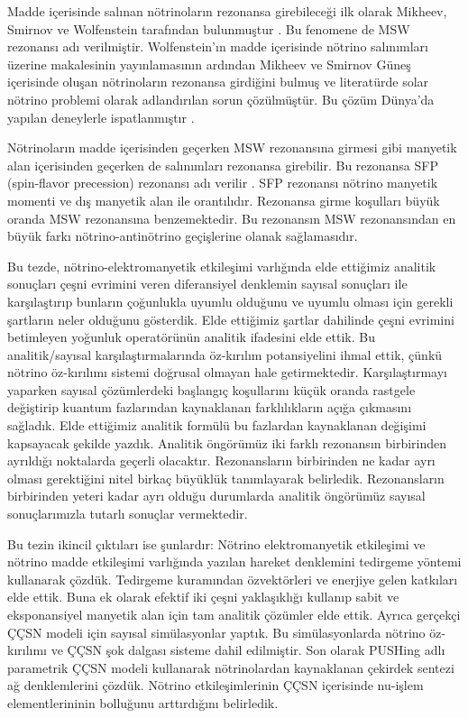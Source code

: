Madde içerisinde salınan nötrinoların rezonansa girebileceği ilk olarak Mikheev, Smirnov ve Wolfenstein tarafından bulunmuştur \cite{Wolfenstein:1977ue, Mikheyev:1985zog}. Bu fenomene de MSW rezonansı adı verilmiştir. Wolfenstein'ın madde içerisinde nötrino salınımları üzerine makalesinin yayınlamasının ardından Mikheev ve Smirnov Güneş içerisinde oluşan nötrinoların rezonansa girdiğini bulmuş ve literatürde solar nötrino problemi olarak adlandırılan sorun çözülmüştür. Bu çözüm Dünya'da yapılan deneylerle ispatlanmıştır \cite{Bellerive:2016byv}.

Nötrinoların madde içerisinden geçerken MSW rezonansına girmesi gibi manyetik alan içerisinden geçerken de salınımları rezonansa girebilir. Bu rezonansa SFP (spin-flavor precession) rezonansı adı verilir \cite{Okun:1986na, Fujikawa:1980yx, Cisneros:1970nq,Akhmedov:1988uk,Akhmedov:1987nc,Lim:1987tk}. SFP rezonansı nötrino manyetik momenti ve dış manyetik alan ile orantılıdır. Rezonansa girme koşulları büyük oranda MSW rezonansına benzemektedir. Bu rezonansın MSW rezonansından en büyük farkı nötrino-antinötrino geçişlerine olanak sağlamasıdır. 

Bu tezde, nötrino-elektromanyetik etkileşimi varlığında elde ettiğimiz analitik sonuçları çeşni evrimini veren diferansiyel denklemin sayısal sonuçları ile karşılaştırıp bunların çoğunlukla uyumlu olduğunu ve uyumlu olması için gerekli şartların neler olduğunu gösterdik. Elde ettiğimiz şartlar dahilinde çeşni evrimini betimleyen yoğunluk operatörünün analitik ifadesini elde ettik. Bu analitik/sayısal karşılaştırmalarında öz-kırılım potansiyelini ihmal ettik, çünkü nötrino öz-kırılımı sistemi doğrusal olmayan hale getirmektedir. Karşılaştırmayı yaparken sayısal çözümlerdeki başlangıç koşullarını küçük oranda rastgele değiştirip kuantum fazlarından kaynaklanan farklılıkların açığa çıkmasını sağladık. Elde ettiğimiz analitik formülü bu fazlardan kaynaklanan değişimi kapsayacak şekilde yazdık. Analitik öngörümüz iki farklı rezonansın birbirinden ayrıldığı noktalarda geçerli olacaktır. Rezonansların birbirinden ne kadar ayrı olması gerektiğini nitel birkaç büyüklük tanımlayarak belirledik. Rezonansların birbirinden yeteri kadar ayrı olduğu durumlarda analitik öngörümüz sayısal sonuçlarımızla tutarlı sonuçlar vermektedir.

Bu tezin ikincil çıktıları ise şunlardır: Nötrino elektromanyetik etkileşimi ve nötrino madde etkileşimi varlığında yazılan hareket denklemini tedirgeme yöntemi kullanarak çözdük. Tedirgeme kuramından özvektörleri ve enerjiye gelen katkıları elde ettik. Buna ek olarak efektif iki çeşni yaklaşıklığı kullanıp sabit ve eksponansiyel manyetik alan için tam analitik çözümler elde ettik. Ayrıca gerçekçi ÇÇSN modeli için sayısal simülasyonlar yaptık. Bu simülasyonlarda nötrino öz-kırılımı ve ÇÇSN şok dalgası sisteme dahil edilmiştir. Son olarak PUSHing adlı parametrik ÇÇSN modeli kullanarak nötrinolardan kaynaklanan çekirdek sentezi ağ denklemlerini çözdük. Nötrino etkileşimlerinin ÇÇSN içerisinde nu-işlem elementlerininin bolluğunu arttırdığını belirledik.

